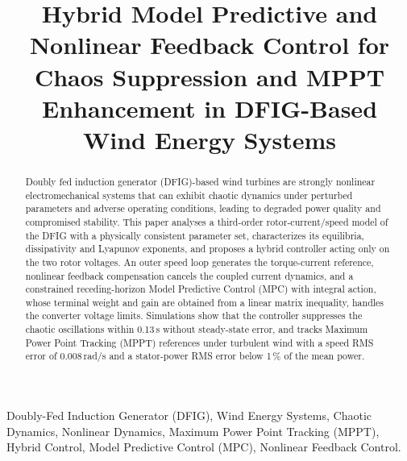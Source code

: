 \documentclass[conference]{IEEEtran}
\begin{document}
\title{Hybrid Model Predictive and Nonlinear Feedback Control for Chaos Suppression and MPPT Enhancement in DFIG-Based Wind Energy Systems}

\author{
\and
{}
\and
{}
}

\maketitle

\IEEEpubidadjcol

\begin{abstract}
Doubly fed induction generator (DFIG)-based wind turbines are strongly nonlinear electromechanical systems that can exhibit chaotic dynamics under perturbed parameters and adverse operating conditions, leading to degraded power quality and compromised stability. This paper analyses a third-order rotor-current/speed model of the DFIG with a physically consistent parameter set, characterizes its equilibria, dissipativity and Lyapunov exponents, and proposes a hybrid controller acting only on the two rotor voltages. An outer speed loop generates the torque-current reference, nonlinear feedback compensation cancels the coupled current dynamics, and a constrained receding-horizon Model Predictive Control (MPC) with integral action, whose terminal weight and gain are obtained from a linear matrix inequality, handles the converter voltage limits. Simulations show that the controller suppresses the chaotic oscillations within 0.13\,s without steady-state error, and tracks Maximum Power Point Tracking (MPPT) references under turbulent wind with a speed RMS error of 0.008\,rad/s and a stator-power RMS error below 1\,\% of the mean power.
\end{abstract}

\begin{IEEEkeywords}
Doubly-Fed Induction Generator (DFIG), Wind Energy Systems, Chaotic Dynamics, Nonlinear Dynamics, Maximum Power Point Tracking (MPPT), Hybrid Control, Model Predictive Control (MPC), Nonlinear Feedback Control.
\end{IEEEkeywords}
\end{document}
